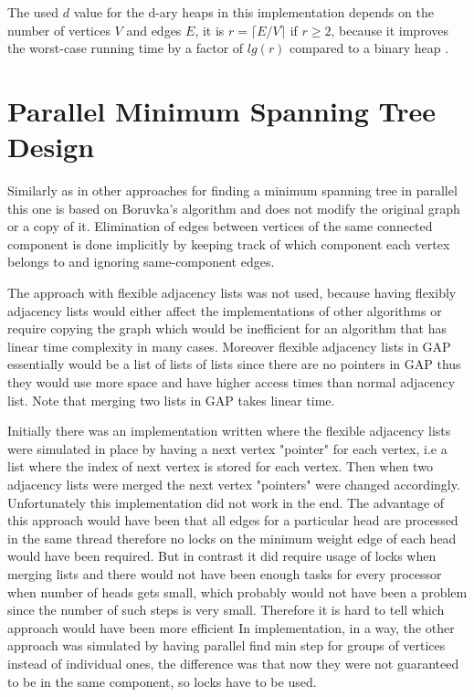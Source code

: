 \documentclass{report}
\theoremstyle{plain}
\theoremstyle{definition}
\theoremstyle{remark}
\begin{document}
The used $d$ value for the d-ary heaps in this implementation depends on the number of vertices $V$ and edges $E$, it is $r=\lceil E/V \rceil$ if $r \geq 2$, because it improves the worst-case running time by a factor of $lg(r)$ compared to a binary heap \cite{algo_sedgewick}.

\section{Parallel Minimum Spanning Tree Design}

Similarly as in other approaches \cite{Bader20061366} for finding a minimum spanning tree in parallel this one is based on Boruvka's algorithm and does not modify the original graph or a copy of it. Elimination of edges between vertices of the same connected component is done implicitly by keeping track of which component each vertex belongs to and ignoring same-component edges.

The approach with flexible adjacency lists \cite{Bader20061366} was not used, because having flexibly adjacency lists would either affect the implementations of other algorithms or require copying the graph which would be inefficient for an algorithm that has linear time complexity in many cases. Moreover flexible adjacency lists in GAP essentially would be a list of lists of lists since there are no pointers in GAP thus they would use more space and have higher access times than normal adjacency list. Note that merging two lists in GAP takes linear time.

Initially there was an implementation written where the flexible adjacency lists were simulated in place by having a next vertex "pointer" for each vertex, i.e a list where the index of next vertex is stored for each vertex. Then when two adjacency lists were merged the next vertex "pointers" were changed accordingly. Unfortunately this implementation did not work in the end. The advantage of this approach would have been that all edges for a particular head are processed in the same thread therefore no locks on the minimum weight edge of each head would have been required. But in contrast it did require usage of locks when merging lists and there would not have been enough tasks for every processor when number of heads gets small, which probably would not have been a problem since the number of such steps is very small. Therefore it is hard to tell which approach would have been more efficient In implementation, in a way, the other approach was simulated by having parallel find min step for groups of vertices instead of individual ones, the difference was that now they were not guaranteed to be in the same component, so locks have to be used.
\end{document}

